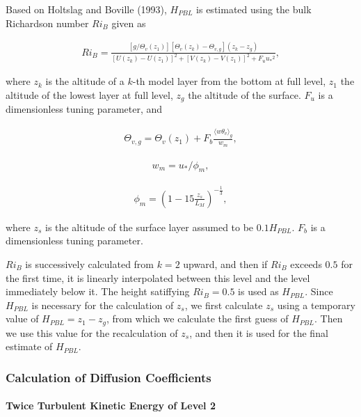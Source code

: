 Based on Holtslag and Boville (1993), \(H_{PBL}\) is estimated using the bulk Richardson number \(Ri_B\) given as

\begin{eqnarray}Ri_B=\frac{[g/\Theta_v(z_1)][\Theta_v(z_k)-\Theta_{v,g}](z_k-z_g)}{[U(z_k)-U(z_1)]^2+[V(z_k)-V(z_1)]^2+F_u{u_*}^2},\end{eqnarray}

where \(z_k\) is the altitude of a \(k\)-th model layer from the bottom at full level, \(z_1\) the altitude of the lowest layer at full level, \(z_g\) the altitude of the surface. \(F_u\) is a
dimensionless tuning parameter, and

\begin{eqnarray}\Theta_{v,g}=\Theta_v(z_1)+F_b \frac{\langle w\theta_v \rangle_g}{w_m},\end{eqnarray}

\begin{eqnarray}w_m=u_*/\phi_m,\end{eqnarray}

\begin{eqnarray}\phi_m=\left(1-15\frac{z_s}{L_M}\right)^{-\frac{1}{3}},\end{eqnarray}

where \(z_s\) is the altitude of the surface layer assumed to be \(0.1H_{PBL}\). \(F_b\) is a dimensionless tuning parameter.

\(Ri_B\) is successively calculated from \(k=2\) upward, and then if \(Ri_B\) exceeds \(0.5\) for the first time, it is linearly interpolated between this level and the level immediately below it. The
height satiffying \(Ri_B=0.5\) is used as \(H_{PBL}\). Since \(H_{PBL}\) is necessary for the calculation of \(z_s\), we first calculate \(z_s\) using a temporary value of \(H_{PBL}=z_1-z_g\), from
which we calculate the first guess of \(H_{PBL}\). Then we use this value for the recalculation of \(z_s\), and then it is used for the final estimate of \(H_{PBL}\).

\hypertarget{calculation-of-diffusion-coefficients}{%
\subsubsection{Calculation of Diffusion Coefficients}\label{calculation-of-diffusion-coefficients}}

\hypertarget{twice-turbulent-kinetic-energy-of-level-2}{%
\paragraph{Twice Turbulent Kinetic Energy of Level 2}\label{twice-turbulent-kinetic-energy-of-level-2}}

